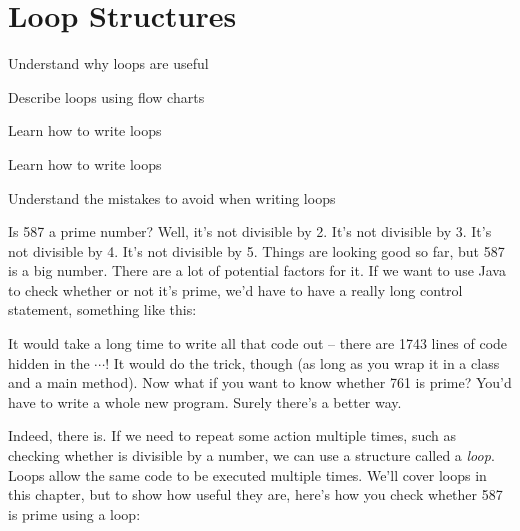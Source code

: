 \chapter{Loop Structures}

\begin{goals}
\item Understand why loops are useful
\item Describe loops using flow charts
\item Learn how to write  loops
\item Learn how to write  loops
\item Understand the mistakes to avoid when writing loops
\end{goals}

Is 587 a prime number? Well, it's not divisible by 2. It's not divisible by 3. It's not divisible by 4. It's not divisible by 5. Things are looking good so far, but 587 is a big number. There are a lot of potential factors for it. If we want to use Java to check whether or not it's prime, we'd have to have a really long control statement, something like this:


It would take a long time to write all that code out -- there are 1743 lines of code hidden in the $\cdots$! It would do the trick, though (as long as you wrap it in a class and a main method). Now what if you want to know whether 761 is prime? You'd have to write a whole new program. Surely there's a better way.

Indeed, there is. If we need to repeat some action multiple times, such as checking whether  is divisible by a number, we can use a structure called a \emph{loop}. Loops allow the same code to be executed multiple times. We'll cover loops in this chapter, but to show how useful they are, here's how you check whether 587 is prime using a loop:


